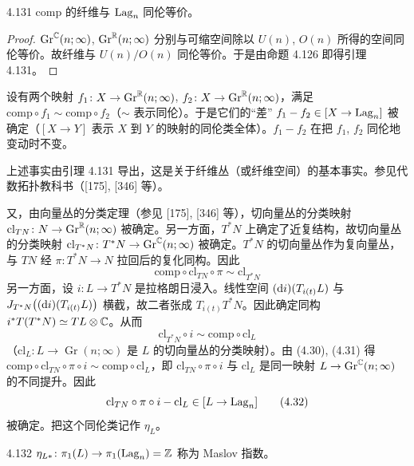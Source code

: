 \begin{lemma*}{4.131}
  $\mathrm{comp}$ 的纤维与 $\operatorname{Lag}_n$ 同伦等价。
\end{lemma*}

\begin{proof}
  $\operatorname{Gr}^{\mathbb{C}}(n;\infty)$, $\operatorname{Gr}^{\mathbb{R}}(n;\infty)$ 分别与可缩空间除以 $U(n)$, $O(n)$ 所得的空间同伦等价。故纤维与 $U(n)/O(n)$ 同伦等价。于是由命题 4.126 即得引理 4.131。
\end{proof}

设有两个映射 $f_1\colon X\to\operatorname{Gr}^{\mathbb{R}}(n;\infty)$, $f_2\colon X\to\operatorname{Gr}^{\mathbb{R}}(n;\infty)$，满足 $\mathrm{comp}\circ f_1\sim\mathrm{comp}\circ f_2$（$\sim$ 表示同伦）。于是它们的“差” $f_1-f_2\in[X\to\operatorname{Lag}_n]$ 被确定（$[X\to Y]$ 表示 $X$ 到 $Y$ 的映射的同伦类全体）。$f_1-f_2$ 在把 $f_1$, $f_2$ 同伦地变动时不变。

上述事实由引理 4.131 导出，这是关于纤维丛（或纤维空间）的基本事实。参见代数拓扑教科书（[175], [346] 等）。

又，由向量丛的分类定理（参见 [175], [346] 等），切向量丛的分类映射 $\mathrm{cl}_{TN}\colon N\to\operatorname{Gr}^{\mathbb{R}}(n;\infty)$ 被确定。另一方面，$T^*N$ 上确定了近复结构，故切向量丛的分类映射 $\mathrm{cl}_{T^*N}\colon T^*N\to\operatorname{Gr}^{\mathbb{C}}(n;\infty)$ 被确定。$T^*N$ 的切向量丛作为复向量丛，与 $TN$ 经 $\pi\colon T^*N\to N$ 拉回后的复化同构。因此
\begin{equation}
  \mathrm{comp}\circ\mathrm{cl}_{TN}\circ\pi\sim\mathrm{cl}_{T^*N} \tag{4.30}
\end{equation}
另一方面，设 $i\colon L\to T^*N$ 是拉格朗日浸入。线性空间 $(\mathrm{d} i)(T_{i(t)}L)$ 与 $J_{T^*N}\bigl((\mathrm{d} i)(T_{i(t)}L)\bigr)$ 横截，故二者张成 $T_{i(t)}T^*N$。因此确定同构 $i^*T(T^*N)\simeq TL\otimes\mathbb{C}$。从而
\begin{equation}
  \mathrm{cl}_{T^*N}\circ i\sim\mathrm{comp}\circ\mathrm{cl}_L \tag{4.31}
\end{equation}
（$\mathrm{cl}_L\colon L\to\operatorname{Gr}(n;\infty)$ 是 $L$ 的切向量丛的分类映射）。由 (4.30), (4.31) 得 $\mathrm{comp}\circ\mathrm{cl}_{TN}\circ\pi\circ i\sim\mathrm{comp}\circ\mathrm{cl}_L$，即 $\mathrm{cl}_{TN}\circ\pi\circ i$ 与 $\mathrm{cl}_L$ 是同一映射 $L\to\operatorname{Gr}^{\mathbb{C}}(n;\infty)$ 的不同提升。因此
\begin{equation}
  \mathrm{cl}_{TN}\circ\pi\circ i-\mathrm{cl}_L\in[L\to\operatorname{Lag}_n] \tag{4.32}
\end{equation}
被确定。把这个同伦类记作 $\eta_L$。

\begin{definition}{4.132}
  $\eta_{L*}\colon\pi_1(L)\to\pi_1(\operatorname{Lag}_n)=\mathbb{Z}$ 称为 Maslov 指数。
\end{definition}

